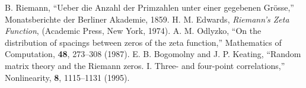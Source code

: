 \documentclass[12pt, twocolumn, reprint, amsmath, amssymb, aps]{revtex4-2}
\begin{document}
\begin{thebibliography}{99}
 B. Riemann, ``Ueber die Anzahl der Primzahlen unter einer gegebenen Grösse,'' Monatsberichte der Berliner Akademie, 1859.
 H. M. Edwards, \emph{Riemann's Zeta Function}, (Academic Press, New York, 1974).
 A. M. Odlyzko, ``On the distribution of spacings between zeros of the zeta function,'' Mathematics of Computation, \textbf{48}, 273--308 (1987).
 E. B. Bogomolny and J. P. Keating, ``Random matrix theory and the Riemann zeros. I. Three- and four-point correlations,'' Nonlinearity, \textbf{8}, 1115--1131 (1995).
\end{thebibliography}
\end{document}
